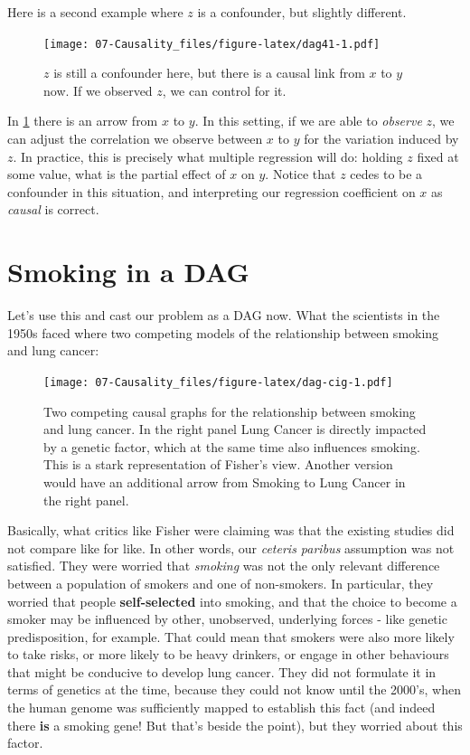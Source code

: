 \documentclass[]{book}
\begin{document}
Here is a second example where \(z\) is a confounder, but slightly
different.

\begin{figure}
\centering
\texttt{[image: 07-Causality\_files/figure-latex/dag41-1.pdf]}
\caption{\label{fig:dag41}\(z\) is still a confounder here, but there is a
causal link from \(x\) to \(y\) now. If we observed \(z\), we can
control for it.}
\end{figure}

In \ref{fig:dag41} there is an arrow from \(x\) to \(y\). In this
setting, if we are able to \emph{observe} \(z\), we can adjust the
correlation we observe between \(x\) to \(y\) for the variation induced
by \(z\). In practice, this is precisely what multiple regression will
do: holding \(z\) fixed at some value, what is the partial effect of
\(x\) on \(y\). Notice that \(z\) cedes to be a confounder in this
situation, and interpreting our regression coefficient on \(x\) as
\emph{causal} is correct.

\section{Smoking in a DAG}\label{smoking-in-a-dag}

Let's use this and cast our problem as a DAG now. What the scientists in
the 1950s faced where two competing models of the relationship between
smoking and lung cancer:

\begin{figure}
\centering
\texttt{[image: 07-Causality\_files/figure-latex/dag-cig-1.pdf]}
\caption{\label{fig:dag-cig}Two competing causal graphs for the relationship
between smoking and lung cancer. In the right panel Lung Cancer is
directly impacted by a genetic factor, which at the same time also
influences smoking. This is a stark representation of Fisher's view.
Another version would have an additional arrow from Smoking to Lung
Cancer in the right panel.}
\end{figure}

Basically, what critics like Fisher were claiming was that the existing
studies did not compare like for like. In other words, our \emph{ceteris
paribus} assumption was not satisfied. They were worried that
\emph{smoking} was not the only relevant difference between a population
of smokers and one of non-smokers. In particular, they worried that
people \textbf{self-selected} into smoking, and that the choice to
become a smoker may be influenced by other, unobserved, underlying
forces - like genetic predisposition, for example. That could mean that
smokers were also more likely to take risks, or more likely to be heavy
drinkers, or engage in other behaviours that might be conducive to
develop lung cancer. They did not formulate it in terms of genetics at
the time, because they could not know until the 2000's, when the human
genome was sufficiently mapped to establish this fact (and indeed there
\textbf{is} a smoking gene! But that's beside the point), but they
worried about this factor.
\end{document}
